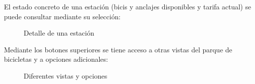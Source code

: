 \FloatBarrier
El estado concreto de una estación (bicis y anclajes disponibles y tarifa actual) se puede consultar mediante su selección:

\begin{figure} [!htb]
	\centering
	\caption{Detalle de una estación}
	\label{fig:detalleEstacion}
\end{figure}

Mediante los botones superiores se tiene acceso a otras vistas del parque de bicicletas y a opciones adicionales:

\begin{figure} [!htb]
	\centering
	\caption{Diferentes vistas y opciones}
	\label{fig:vistasActionBar}
\end{figure}

